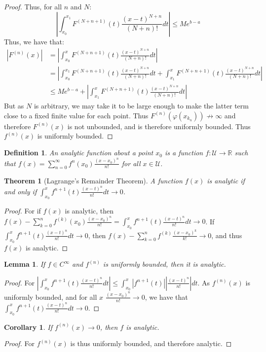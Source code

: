 \documentclass[crop=false,class=book]{standalone}
\theoremstyle{mystyle}
\newtheorem{theorem}{Theorem}[section]
\newtheorem{definition}{Definition}[section]
\newtheorem{lemma}{Lemma}[section]
\newtheorem{corollary}{Corollary}[section]
\begin{document}
\begin{proof}
Thus, for all $n$ and $N$:
\begin{equation*}
    |\int_{x_0}^{x_1} F^{(N+n+1)}(t)\frac{(x-t)^{N+n}}{(N+n)!}dt|\leq Me^{b-a}
\end{equation*}
Thus, we have that:
\begin{align*}
    |F^{(n)}(x)| &= |\int_{x_0}^{x} F^{(N+n+1)}(t)\frac{(x-t)^{N+n}}{(N+n)!}dt|\\ &= |\int_{x_0}^{x_1} F^{(N+n+1)}(t)\frac{(x-t)^{N+n}}{(N+n)!}dt+\int_{x_1}^{x} F^{(N+n+1)}(t)\frac{(x-t)^{N+n}}{(N+n)!}dt|\\
    &\leq Me^{b-a}+|\int_{x_1}^{x} F^{(N+n+1)}(t)\frac{(x-t)^{N+n}}{(N+n)!}dt|
\end{align*}
But as $N$ is arbitrary, we may take it to be large enough to make the latter term close to a fixed finite value for each point. Thus $F^{(n)}(\varphi(x_{k_n}))\not\rightarrow \infty$ and therefore $F^{(n)}(x)$ is not unbounded, and is therefore uniformly bounded. Thus $f^{(n)}(x)$ is uniformly bounded.
\end{proof}
\begin{definition}
An analytic function about a point $x_0$ is a function $f:\mathcal{U}\rightarrow\mathbb{R}$ such that $f(x) = \sum_{n=0}^{\infty} f^{n}(x_0) \frac{(x-x_0)^{n}}{n!}$ for all $x\in\mathcal{U}$.
\end{definition}
\begin{theorem}[Lagrange's Remainder Theorem]
A function $f(x)$ is analytic if and only if $\int_{x_0}^{x}f^{n+1}(t)\frac{(x-t)^n}{n!}dt\rightarrow 0$.
\end{theorem}
\begin{proof}
For if $f(x)$ is analytic, then $f(x)-\sum_{k=0}^{n} f^{(k)}(x_0)\frac{(x-x_0)^n}{n!} = \int_{x_0}^{x}f^{n+1}(t)\frac{(x-t)^n}{n!}dt \rightarrow 0$. If $\int_{x_0}^{x}f^{n+1}(t)\frac{(x-t)^n}{n!}dt\rightarrow 0$, then $f(x)-\sum_{k=0}^{n}f^{(k)}\frac{(x-x_0)^{k}}{k!}\rightarrow 0$, and thus $f(x)$ is analytic.
\end{proof}
\begin{lemma}
If $f\in C^{\infty}$ and $f^{(n)}$ is uniformly bounded, then it is analytic.
\end{lemma}
\begin{proof}
For $|\int_{x_0}^{x}f^{n+1}(t)\frac{(x-t)^n}{n!}dt|\leq \int_{x_0}^{x}|f^{n+1}(t)||\frac{(x-t)^n}{n!}|dt$. As $f^{(n)}(x)$ is uniformly bounded, and for all $x$ $\frac{(x-x_0)^n}{n!} \rightarrow 0$, we have that $\int_{x_0}^{x}f^{n+1}(t)\frac{(x-t)^n}{n!}dt\rightarrow 0$.
\end{proof}
\begin{corollary}
If $f^{(n)}(x)\rightarrow 0$, then $f$ is analytic.
\end{corollary}
\begin{proof}
For $f^{(n)}(x)$ is thus uniformly bounded, and therefore analytic.
\end{proof}
\end{document}
